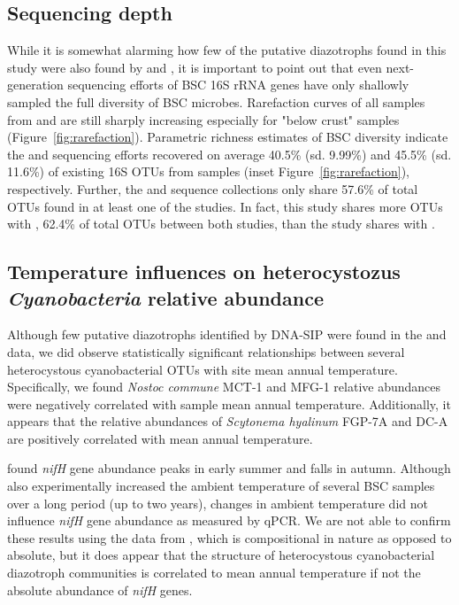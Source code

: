 \subsection{Sequencing depth}
While it is somewhat alarming how few of the putative diazotrophs found in
this study were also found by \citet{Garcia_Pichel_2013} and
\citet{Steven_2013}, it is important to point out that even next-generation
sequencing efforts of BSC 16S rRNA genes have only shallowly sampled the full
diversity of BSC microbes.  Rarefaction curves of all samples from
\citet{Steven_2013} and \citet{Garcia_Pichel_2013} are still sharply
increasing especially for "below crust" samples
(Figure~\ref{fig:rarefaction}). Parametric richness estimates of BSC
diversity indicate the \citet{Steven_2013} and \citet{Garcia_Pichel_2013}
sequencing efforts recovered on average 40.5\% (sd. 9.99\%) and 45.5\% (sd.
11.6\%) of existing 16S OTUs from samples (inset
Figure~\ref{fig:rarefaction}), respectively. Further, the \citet{Steven_2013}
and \citet{Garcia_Pichel_2013} sequence collections only share 57.6\% of
total OTUs found in at least one of the studies. In fact, this study shares
more OTUs with \citet{Steven_2013}, 62.4\% of total OTUs between both
studies, than the \citet{Steven_2013} study shares with
\citet{Garcia_Pichel_2013}. 

\subsection{Temperature influences on heterocystozus \textit{Cyanobacteria}
relative abundance} Although few putative diazotrophs identified by DNA-SIP
were found in the \citet{Garcia_Pichel_2013} and \citet{Steven_2013} data, we
did observe statistically significant relationships between several
heterocystous cyanobacterial OTUs with site mean annual temperature.
Specifically, we found \textit{Nostoc commune} MCT-1 and MFG-1 relative
abundances were negatively correlated with sample mean annual temperature.
Additionally, it appears that the relative abundances of \textit{Scytonema
hyalinum} FGP-7A and DC-A are positively correlated with mean annual
temperature.

\citet{Yeager_2012} found \textit{nifH} gene abundance peaks in early summer
and falls in autumn. Although \citet{Yeager_2012} also experimentally
increased the ambient temperature of several BSC samples over a long period
(up to two years), changes in ambient temperature did not influence
\textit{nifH} gene abundance as measured by qPCR. We are not able to confirm
these results using the data from \citet{Garcia_Pichel_2013}, which is
compositional in nature as opposed to absolute, but it does appear that
the structure of heterocystous cyanobacterial diazotroph
communities is correlated to mean annual temperature if not the absolute
abundance of \textit{nifH} genes. 

